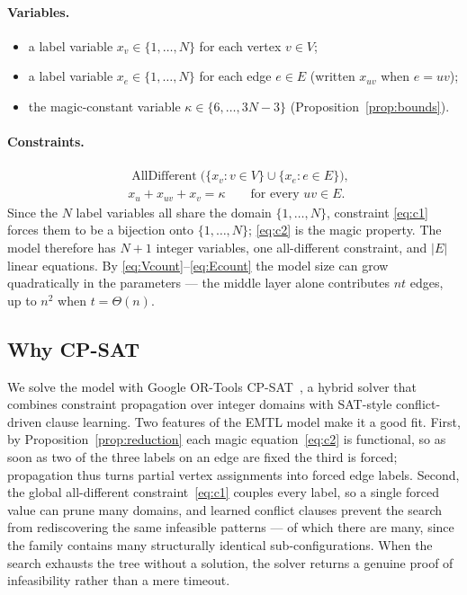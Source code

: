 \documentclass[11pt,a4paper]{article}
\theoremstyle{plain}
\theoremstyle{definition}
\theoremstyle{remark}
\newcommand{\km}{\kappa}
\DeclareMathOperator{\AllDiff}{AllDifferent}
\begin{document}
\paragraph{Variables.}
\begin{itemize}[itemsep=1pt]
  \item a label variable $x_v\in\{1,\dots,N\}$ for each vertex $v\in V$;
  \item a label variable $x_e\in\{1,\dots,N\}$ for each edge $e\in E$ (written
        $x_{uv}$ when $e=uv$);
  \item the magic-constant variable $\km\in\{6,\dots,3N-3\}$
        (Proposition~\ref{prop:bounds}).
\end{itemize}

\paragraph{Constraints.}
\begin{align}
  &\AllDiff\bigl(\{x_v:v\in V\}\cup\{x_e:e\in E\}\bigr), \tag{C1}\label{eq:c1}\\
  &x_u+x_{uv}+x_v=\km \qquad\text{for every } uv\in E. \tag{C2}\label{eq:c2}
\end{align}
Since the $N$ label variables all share the domain $\{1,\dots,N\}$, constraint
\eqref{eq:c1} forces them to be a bijection onto $\{1,\dots,N\}$; \eqref{eq:c2} is the
magic property. The model therefore has $N+1$ integer variables, one all-different
constraint, and $|E|$ linear equations. By \eqref{eq:Vcount}--\eqref{eq:Ecount} the
model size can grow quadratically in the parameters --- the middle layer alone
contributes $nt$ edges, up to $n^2$ when $t=\Theta(n)$.

\subsection{Why CP-SAT}\label{sub:whycpsat}

We solve the model with Google OR-Tools CP-SAT~\cite{ortools}, a hybrid solver that
combines constraint propagation over integer domains with SAT-style
conflict-driven clause learning. Two features of the EMTL model make it a good fit.
First, by Proposition~\ref{prop:reduction} each magic equation~\eqref{eq:c2} is
functional, so as soon as two of the three labels on an edge are fixed the third is
forced; propagation thus turns partial vertex assignments into forced edge labels.
Second, the global all-different constraint~\eqref{eq:c1} couples every label, so a
single forced value can prune many domains, and learned conflict clauses prevent the
search from rediscovering the same infeasible patterns --- of which there are many,
since the family contains many structurally identical sub-configurations. When the
search exhausts the tree without a solution, the solver returns a genuine proof of
infeasibility rather than a mere timeout.
\end{document}
